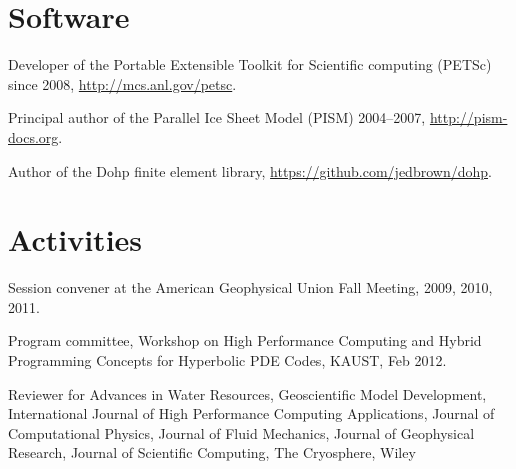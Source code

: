 \documentclass[10pt,letterpaper]{article}
\renewenvironment{itemize}{
  \begin{list}{}{
    \setlength{\leftmargin}{1.5em}
    \setlength{\itemsep}{0.25em}
    \setlength{\parskip}{0pt}
    \setlength{\parsep}{0.25em}
  }
}{
  \end{list}
}
\begin{document}
\section*{Software}
\begin{itemize}
\item Developer of the Portable Extensible Toolkit for Scientific computing (PETSc) since 2008, \url{http://mcs.anl.gov/petsc}.
\item Principal author of the Parallel Ice Sheet Model (PISM) 2004--2007, \url{http://pism-docs.org}.
\item Author of the Dohp finite element library, \url{https://github.com/jedbrown/dohp}.
\end{itemize}

\section*{Activities}
\begin{itemize}
\item Session convener at the American Geophysical Union Fall Meeting, 2009, 2010, 2011.
\item Program committee, Workshop on High Performance Computing and Hybrid Programming Concepts for Hyperbolic PDE Codes, KAUST, Feb 2012.
\item Reviewer for
  Advances in Water Resources,
  Geoscientific Model Development,
  International Journal of High Performance Computing Applications,
  Journal of Computational Physics,
  Journal of Fluid Mechanics,
  Journal of Geophysical Research,
  Journal of Scientific Computing,
  The Cryosphere,
  Wiley
\end{itemize}


\end{document}
